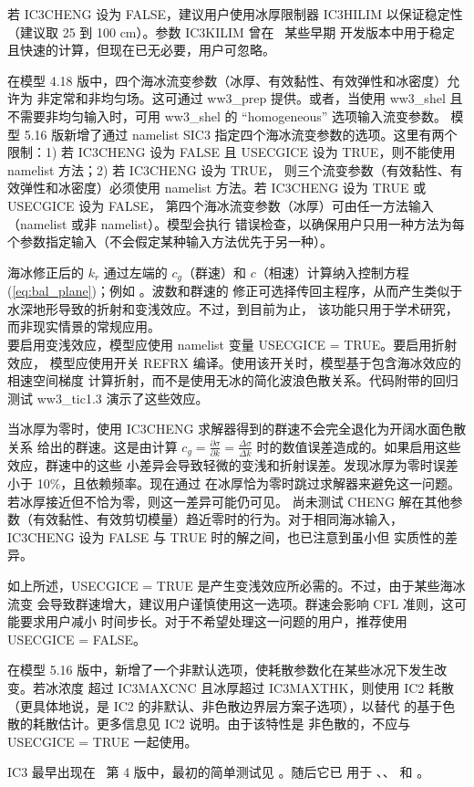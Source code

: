 若 {\code IC3CHENG} 设为 {\code FALSE}，建议用户使用冰厚限制器 {\code IC3HILIM}
以保证稳定性（建议取 25 到 100 cm）。参数 {\code IC3KILIM} 曾在 \ws\ 某些早期
开发版本中用于稳定且快速的计算，但现在已无必要，用户可忽略。

在模型 4.18 版中，四个海冰流变参数（冰厚、有效黏性、有效弹性和冰密度）允许为
非定常和非均匀场。这可通过 {\file ww3\_prep} 提供。或者，当使用 {\file ww3\_shel}
且不需要非均匀输入时，可用 {\file ww3\_shel} 的 ``homogeneous'' 选项输入流变参数。
模型 5.16 版新增了通过 namelist {\F SIC3} 指定四个海冰流变参数的选项。这里有两个
限制：1) 若 {\code IC3CHENG} 设为 {\code FALSE} 且 {\code USECGICE} 设为
{\code TRUE}，则不能使用 namelist 方法；2) 若 {\code IC3CHENG} 设为 {\code TRUE}，
则三个流变参数（有效黏性、有效弹性和冰密度）必须使用 namelist 方法。若
{\code IC3CHENG} 设为 {\code TRUE} 或 {\code USECGICE} 设为 {\code FALSE}，
第四个海冰流变参数（冰厚）可由任一方法输入（namelist 或非 namelist）。模型会执行
错误检查，以确保用户只用一种方法为每个参数指定输入（不会假定某种输入方法优先于另一种）。

海冰修正后的 ${k_r}$ 通过左端的 $c_g$（群速）和 $c$（相速）计算纳入控制方程
(\ref{eq:bal_plane})；例如 \citet[][以及后续未发表工作]{art:RH09}。波数和群速的
修正可选择传回主程序，从而产生类似于水深地形导致的折射和变浅效应。不过，到目前为止，
该功能只用于学术研究，而非现实情景的常规应用。\\

要启用变浅效应，模型应使用 namelist 变量 {\code USECGICE = TRUE}。要启用折射效应，
模型应使用开关 {\code REFRX} 编译。使用该开关时，模型基于包含海冰效应的相速空间梯度
计算折射，而不是使用无冰的简化波浪色散关系。代码附带的回归测试 {\file ww3\_tic1.3}
演示了这些效应。

当冰厚为零时，使用 {\code IC3CHENG} 求解器得到的群速不会完全退化为开阔水面色散关系
给出的群速。这是由计算 $c_g = \frac{\partial \sigma}{\partial k} =
\frac{\Delta \sigma}{\Delta k} $ 时的数值误差造成的。如果启用这些效应，群速中的这些
小差异会导致轻微的变浅和折射误差。发现冰厚为零时误差小于 10\%，且依赖频率。现在通过
在冰厚恰为零时跳过求解器来避免这一问题。若冰厚接近但不恰为零，则这一差异可能仍可见。
尚未测试 CHENG 解在其他参数（有效黏性、有效剪切模量）趋近零时的行为。对于相同海冰输入，
{\code IC3CHENG} 设为 {\code FALSE} 与 {\code TRUE} 时的解之间，也已注意到虽小但
实质性的差异。

如上所述，{\code USECGICE = TRUE} 是产生变浅效应所必需的。不过，由于某些海冰流变
会导致群速增大，建议用户谨慎使用这一选项。群速会影响 CFL 准则，这可能要求用户减小
时间步长。对于不希望处理这一问题的用户，推荐使用 {\code USECGICE = FALSE}。

在模型 5.16 版中，新增了一个非默认选项，使耗散参数化在某些冰况下发生改变。若冰浓度
超过 {\code IC3MAXCNC} 且冰厚超过 {\code IC3MAXTHK}，则使用 {\code IC2} 耗散
（更具体地说，是 {\code IC2} 的非默认、非色散边界层方案子选项），以替代
\cite{art:WS10} 的基于色散的耗散估计。更多信息见 {\code IC2} 说明。由于该特性是
非色散的，不应与 {\code USECGICE = TRUE} 一起使用。

{\code IC3} 最早出现在 \ww\ 第 4 版中，最初的简单测试见 \cite{pro:RZ14}。随后它已
用于 \cite{art:LKS15}、\cite{art:WHR16}、\cite{art:RTS16} 和 \cite{art:CRT17}。
